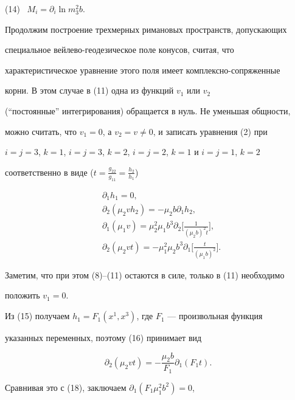 (14) \ $M_i=\partial_i\ln m^2_3b$. 


 


Продолжим построение трехмерных римановых пространств, допускающих 


специальное вейлево-геодезическое поле конусов, считая, что 


характеристическое уравнение этого поля имеет комплексно-сопряженные 


корни. В этом случае в (11) одна из функций $v_1$ или $v_2$ 


(``постоянные'' интегрирования) обращается в нуль. Не уменьшая общности, 


можно считать, что $v_1=0$, а $v_2=v\ne0$, и записать уравнения (2) при 


$i=j=3$, $k=1$, $i=j=3$, $k=2$, $i=j=2$, $k=1$ и $i=j=1$, $k=2$ 


соответственно в виде ($t=\frac{g_{22}}{g_{11}}=\frac{h_2}{h_1}$) 


\begin{align} 


&\partial_1h_1=0,\\ 


&\partial_2(\mu_2 v h_2)=-\mu_2b\partial_1h_2,\\ 


&\partial_1(\mu_1v)=\mu^2_2\mu_1b^3\partial_2\bigg[ 


\frac{1}{(\mu_2b)^2t}\bigg],\\ 


&\partial_2(\mu_2v t)=-\mu^2_1\mu_2b^3\partial_1\bigg[ 


\frac{t}{(\mu_1b)^2}\bigg]. 


\end{align} 


 


Заметим, что при этом (8)--(11) остаются в силе, только в (11) необходимо


положить $v_1=0$. 


 


Из (15) получаем $h_1=F_1(x^1,x^3)$, где $F_1$ --- произвольная функция 


указанных переменных, поэтому (16) принимает вид 


$$ 


\partial_2(\mu_2v t)=-\frac{\mu_2b}{F_1}\partial_1(F_1t). 


$$ 


Сравнивая это с (18), заключаем $\partial_1(F_1\mu^2_1b^2)=0$, 


